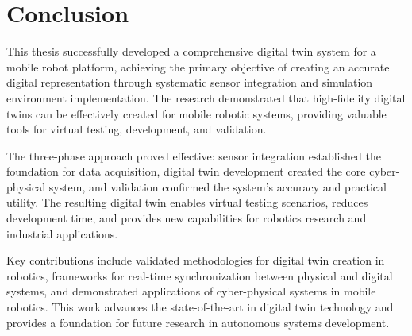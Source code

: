 \vspace{21.5pt}
\chapter{Conclusion}

This thesis successfully developed a comprehensive digital twin system for a mobile robot platform, achieving the primary objective of creating an accurate digital representation through systematic sensor integration and simulation environment implementation. The research demonstrated that high-fidelity digital twins can be effectively created for mobile robotic systems, providing valuable tools for virtual testing, development, and validation.

The three-phase approach proved effective: sensor integration established the foundation for data acquisition, digital twin development created the core cyber-physical system, and validation confirmed the system's accuracy and practical utility. The resulting digital twin enables virtual testing scenarios, reduces development time, and provides new capabilities for robotics research and industrial applications.

Key contributions include validated methodologies for digital twin creation in robotics, frameworks for real-time synchronization between physical and digital systems, and demonstrated applications of cyber-physical systems in mobile robotics. This work advances the state-of-the-art in digital twin technology and provides a foundation for future research in autonomous systems development.

